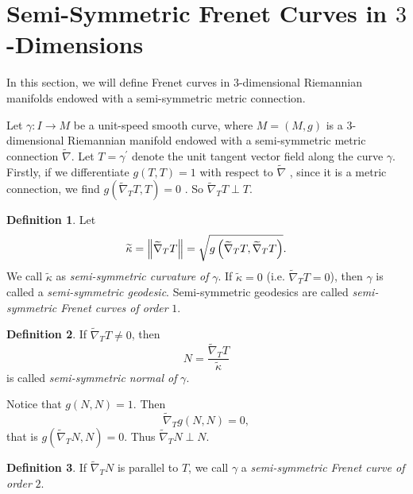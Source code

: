 \documentclass{amsart}
\theoremstyle{plain}
\theoremstyle{definition}
\newtheorem{definition}{Definition}
\theoremstyle{remark}
\numberwithin{equation}{section}
\begin{document}
\section{\label{sect-semisymmetric Frenet}Semi-Symmetric Frenet Curves in $3$%
-Dimensions}

In this section, we will define Frenet curves in $3$-dimensional Riemannian
manifolds endowed with a semi-symmetric metric connection.

Let $\gamma :I\rightarrow M$ be a unit-speed smooth curve, where $M=\left(
M,g\right) $ is a $3$-dimensional Riemannian manifold endowed with a
semi-symmetric metric connection $\widetilde{\nabla }$. Let $T=\gamma
^{\prime }$ denote the unit tangent vector field along the curve $\gamma $.
Firstly, if we differentiate $g(T,T)=1$ with respect to $\widetilde{\nabla }$%
, since it is a metric connection, we find $g(\widetilde{\nabla }_{T}T,T)=0$%
. So $\widetilde{\nabla }_{T}T\perp T.$

\begin{definition}
Let 
\begin{equation*}
\widetilde{\kappa }=\left\Vert \widetilde{\nabla }_{T}T\right\Vert =\sqrt{%
g\left( \widetilde{\nabla }_{T}T,\widetilde{\nabla }_{T}T\right) }.
\end{equation*}%
We call $\widetilde{\kappa }$ as \textit{semi-symmetric curvature of} $%
\gamma $. If $\widetilde{\kappa }=0$ (i.e. $\widetilde{\nabla }_{T}T=0$),
then $\gamma $ is called a \textit{semi-symmetric geodesic}. Semi-symmetric
geodesics are called \textit{semi-symmetric Frenet curves of order} $1$.
\end{definition}

\begin{definition}
If $\widetilde{\nabla }_{T}T\neq 0$, then 
\begin{equation*}
N=\frac{\widetilde{\nabla }_{T}T}{\widetilde{\kappa }}
\end{equation*}%
is called \textit{semi-symmetric normal of} $\gamma $.
\end{definition}

Notice that $g(N,N)=1$. Then 
\begin{equation*}
\widetilde{\nabla }_{T}g(N,N)=0,
\end{equation*}%
that is $g(\widetilde{\nabla }_{T}N,N)=0.$ Thus $\widetilde{\nabla }%
_{T}N\perp N.$

\begin{definition}
If $\widetilde{\nabla }_{T}N$ is parallel to $T$, we call $\gamma $ a 
\textit{semi-symmetric Frenet curve of order }$2$.
\end{definition}
\end{document}
